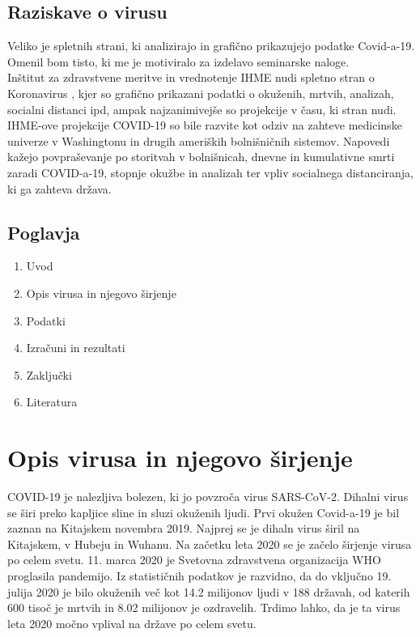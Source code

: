 \documentclass[a4paper,11pt]{article}
\begin{document}
\subsection{Raziskave o virusu}
Veliko je spletnih strani, ki analizirajo in grafično prikazujejo podatke Covid-a-19. Omenil bom tisto, ki me je motiviralo za izdelavo seminarske naloge. \\
Inštitut za zdravstvene meritve in vrednotenje IHME nudi spletno stran o Koronavirus \cite{cvd19IHME}, kjer so grafično prikazani podatki o okuženih, mrtvih, analizah, socialni distanci ipd, ampak najzanimivejše so projekcije v času, ki stran nudi. IHME-ove projekcije COVID-19 so bile razvite kot odziv na zahteve medicinske univerze v Washingtonu in drugih ameriških bolnišničnih sistemov. Napovedi kažejo povpraševanje po storitvah v bolnišnicah, dnevne in kumulativne smrti zaradi COVID-a-19, stopnje okužbe in analizah ter vpliv socialnega distanciranja, ki ga zahteva država.

\subsection{Poglavja}
\begin{enumerate}
\item{Uvod}
\item{Opis virusa in njegovo širjenje}
\item{Podatki}
\item{Izračuni in rezultati}
\item{Zaključki}
\item{Literatura}
\end{enumerate}

\section{Opis virusa in njegovo širjenje}
COVID-19 je nalezljiva bolezen, ki jo povzroča virus SARS-CoV-2. Dihalni virus se širi preko kapljice sline in sluzi okuženih ljudi. Prvi okužen Covid-a-19 je bil zaznan na Kitajskem novembra 2019. Najprej se je dihaln virus širil na Kitajskem, v Hubeju in Wuhanu. Na začetku leta 2020 se je začelo širjenje virusa po celem svetu. 11. marca 2020 je Svetovna zdravstvena organizacija WHO proglasila pandemijo. Iz statističnih podatkov je razvidno, da do vključno 19. julija 2020 je bilo okuženih več kot 14.2 milijonov ljudi v 188 državah, od katerih 600 tisoč je mrtvih in 8.02 milijonov je ozdravelih. Trdimo lahko, da je ta virus leta 2020 močno vplival na države po celem svetu.
\end{document}
